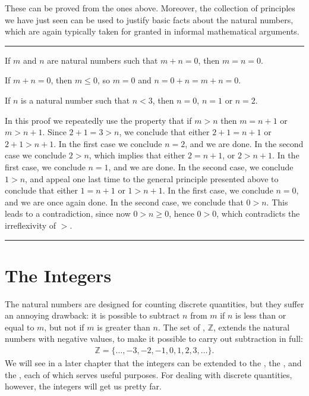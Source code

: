 \documentclass[letterpaper,10pt,english]{sphinxmanual}
\begin{document}
\sphinxAtStartPar
These can be proved from the ones above. Moreover, the collection of principles we have just seen can be used to justify basic facts about the natural numbers, which are again typically taken for granted in informal mathematical arguments.


\bigskip\hrule\bigskip


\sphinxAtStartPar
{} If \(m\) and \(n\) are natural numbers such that \(m + n = 0\), then \(m = n = 0\).

\sphinxAtStartPar
{} If \(m + n = 0\), then \(m \le 0\), so \(m = 0\) and \(n = 0 + n = m + n = 0\).

\sphinxAtStartPar
{} If \(n\) is a natural number such that \(n < 3\), then \(n = 0\), \(n = 1\) or \(n = 2\).

\sphinxAtStartPar
{} In this proof we repeatedly use the property that if \(m > n\) then \(m = n + 1\) or \(m > n + 1\). Since \(2 + 1 = 3 > n\), we conclude that either \(2 + 1 = n + 1\) or \(2 + 1 > n + 1\). In the first case we conclude \(n = 2\), and we are done. In the second case we conclude \(2 > n\), which implies that either \(2 = n + 1\), or \(2 > n + 1\). In the first case, we conclude \(n = 1\), and we are done. In the second case, we conclude \(1 > n\), and appeal one last time to the general principle presented above to conclude that either \(1 = n + 1\) or \(1 > n + 1\). In the first case, we conclude \(n = 0\), and we are once again done. In the second case, we conclude that \(0 > n\). This leads to a contradiction, since now \(0 > n \ge 0\), hence \(0 > 0\), which contradicts the irreflexivity of \(>\).


\bigskip\hrule\bigskip



\section{The Integers}
\label{\detokenize{the_natural_numbers_and_induction:the-integers}}\label{\detokenize{the_natural_numbers_and_induction:id5}}
\sphinxAtStartPar
The natural numbers are designed for counting discrete quantities, but they suffer an annoying drawback: it is possible to subtract \(n\) from \(m\) if \(n\) is less than or equal to \(m\), but not if \(m\) is greater than \(n\). The set of , \(\mathbb{Z}\), extends the natural numbers with negative values, to make it possible to carry out subtraction in full:
\begin{equation*}
\begin{split}\mathbb{Z} = \{ \ldots, -3, -2, -1, 0, 1, 2, 3, \ldots \}.\end{split}
\end{equation*}
\sphinxAtStartPar
We will see in a later chapter that the integers can be extended to the , the , and the , each of which serves useful purposes. For dealing with discrete quantities, however, the integers will get us pretty far.
\end{document}
